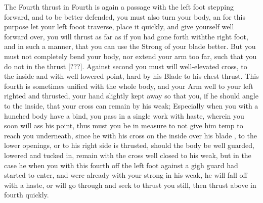 The Fourth thrust in Fourth is again a passage with the left foot
stepping forward, and to be better defended, you must also turn your
body, an for this purpose let your left fooot traverse, place it
quickly, and give yourself well forward over,
you will thrust as far as if you had gone forth withthe right foot,
and in such a manner, that you can use the Strong of your blade better.
But you must not completely bend your  body, nor extend your arm too
far, such that you do not in the thrust [???]. Against second you must
will well-elevated cross, to the inside and with well lowered point,
hard by his Blade to his chest thrust.
This fourth is sometimes unified with the whole body, and your Arm
well to your left righted and thrusted, your hand slightly kept away
so that you, if he should angle to the inside, that your cross can
remain by his weak; Especially when you with a hunched body have a
bind, you pass in a single work with haste, wherein you soon will ass
his point, thus must you be in measure to not give him temp to reach
you underneath, since he with his cross on the inside over his blade
, to the lower openings, or to his right side is thrusted, should the
body be well guarded, lowered and tucked in, remain with the cross
well closed to his weak, but in the case he when you with this fourth
off the left foot against a gigh guard had started to enter, and were
already with your strong in his weak, he will fall off with a haste,
or will go through and seek to thrust you still, then thrust above in
fourth quickly.